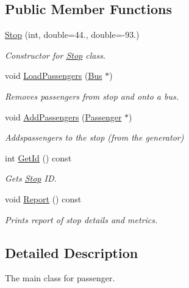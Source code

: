 \subsection*{Public Member Functions}
\begin{DoxyCompactItemize}
\item 
\hyperlink{classStop_a59d881f072b1cf89512bb15a51ffc773}{Stop} (int, double=44., double=-\/93.)
\begin{DoxyCompactList}\small\item\em Constructor for \hyperlink{classStop}{Stop} class. \end{DoxyCompactList}\item 
\mbox{\label{classStop_a5c5c872c082ff6aded344e2cb3e1dc76}} 
void \hyperlink{classStop_a5c5c872c082ff6aded344e2cb3e1dc76}{Load\+Passengers} (\hyperlink{classBus}{Bus} $\ast$)
\begin{DoxyCompactList}\small\item\em Removes passengers from stop and onto a bus. \end{DoxyCompactList}\item 
\mbox{\label{classStop_a953b0e07fd4a1b7af68e74e5ff7700d0}} 
void \hyperlink{classStop_a953b0e07fd4a1b7af68e74e5ff7700d0}{Add\+Passengers} (\hyperlink{classPassenger}{Passenger} $\ast$)
\begin{DoxyCompactList}\small\item\em Addspassengers to the stop (from the generator) \end{DoxyCompactList}\item 
int \hyperlink{classStop_a2f3b845d5a338f197226c90696314904}{Get\+Id} () const
\begin{DoxyCompactList}\small\item\em Gets \hyperlink{classStop}{Stop} ID. \end{DoxyCompactList}\item 
\mbox{\label{classStop_a913202b0c6d4bad1498873251d5d2a2f}} 
void \hyperlink{classStop_a913202b0c6d4bad1498873251d5d2a2f}{Report} () const
\begin{DoxyCompactList}\small\item\em Prints report of stop details and metrics. \end{DoxyCompactList}\end{DoxyCompactItemize}


\subsection{Detailed Description}
The main class for passenger. 

